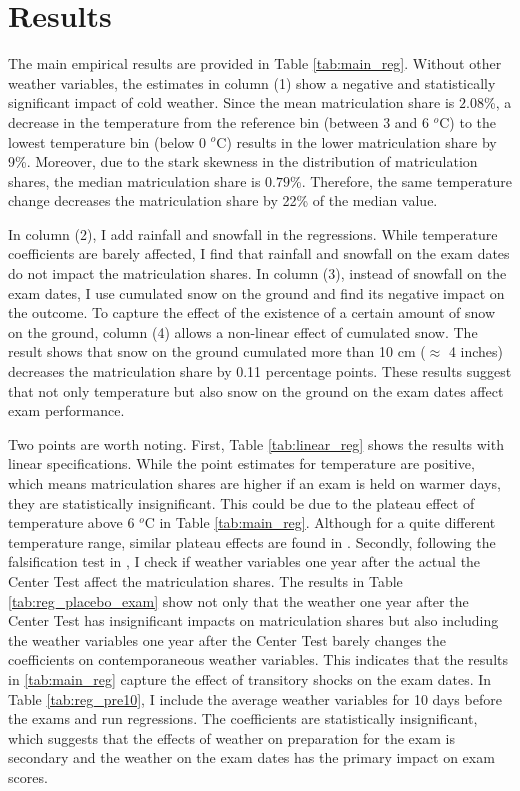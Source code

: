 \documentclass[12pt,letterpaper]{article}
\begin{document}
\section{Results}\label{sec:results}

The main empirical results are provided in Table \ref{tab:main_reg}.
Without other weather variables, the estimates in column (1) show a negative and statistically significant impact of cold weather.
Since the mean matriculation share is $2.08$\%, a decrease in the temperature from the reference bin (between 3 and 6 $^o$C) to the lowest temperature bin (below 0 $^o$C) results in the lower matriculation share by 9\%.
Moreover, due to the stark skewness in the distribution of matriculation shares, the median matriculation share is $0.79$\%.
Therefore, the same temperature change decreases the matriculation share by 22\% of the median value.

In column (2), I add rainfall and snowfall in the regressions.
While temperature coefficients are barely affected, I find that rainfall and snowfall on the exam dates do not impact the matriculation shares.
In column (3), instead of snowfall on the exam dates, I use cumulated snow on the ground and find its negative impact on the outcome. 
To capture the effect of the existence of a certain amount of snow on the ground, column (4) allows a non-linear effect of cumulated snow.
The result shows that snow on the ground cumulated more than 10 cm ($\approx$ 4 inches) decreases the matriculation share by 0.11 percentage points.
These results suggest that not only temperature but also snow on the ground on the exam dates affect exam performance.

Two points are worth noting.
First, Table \ref{tab:linear_reg} shows the results with linear specifications.
While the point estimates for temperature are positive, which means matriculation shares are higher if an exam is held on warmer days, they are statistically insignificant. 
This could be due to the plateau effect of temperature above 6 $^o$C in Table \ref{tab:main_reg}.
Although for a quite different temperature range, similar plateau effects are found in \citet{Park2020a}.
Secondly, following the falsification test in \citet{Cho2017}, I check if weather variables one year after the actual the Center Test affect the matriculation shares.
The results in Table \ref{tab:reg_placebo_exam} show not only that the weather one year after the Center Test has insignificant impacts on matriculation shares but also including the weather variables one year after the Center Test barely changes the coefficients on contemporaneous weather variables.
This indicates that the results in \ref{tab:main_reg} capture the effect of transitory shocks on the exam dates.
In Table \ref{tab:reg_pre10}, I include the average weather variables for 10 days before the exams and run regressions.
The coefficients are statistically insignificant, which suggests that the effects of weather on preparation for the exam is secondary and the weather on the exam dates has the primary impact on exam scores.
\end{document}
